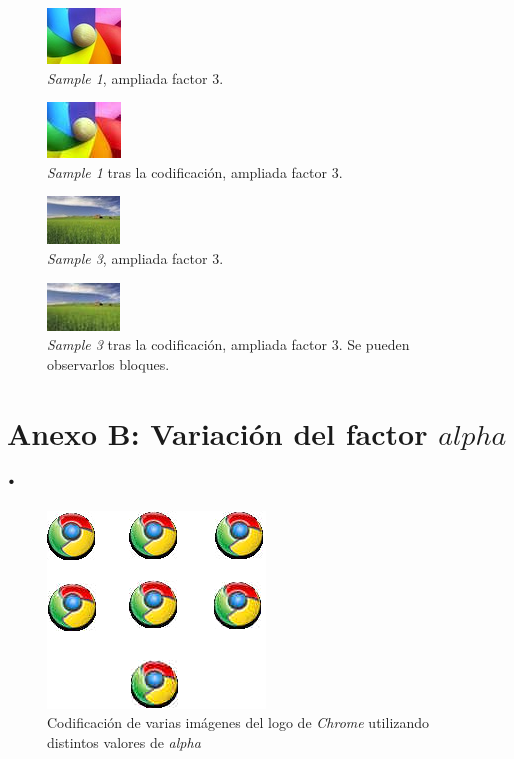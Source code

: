 \documentclass[%
	final,
	reprint,
	notitlepage,
	narroweqnarray,
	inline,
	twoside,
	invited
	]{ieee}
\begin{document}
\begin{thebibliography}{1}
\begin{figure}[H]
\centering
	\includegraphics[scale=3]{./img/sample_1_in.jpg}
	\caption{\textit{Sample 1}, ampliada factor 3.}
\end{figure}

\begin{figure}[H]
\centering
	\includegraphics[scale=3]{./img/sample_1_alpha_1_out.jpg}
	\caption{\textit{Sample 1} tras la codificación, ampliada factor 3.}
\end{figure}

\begin{figure}[H]
\centering
	\includegraphics[scale=3]{./img/sample_3_in.jpg}
	\caption{\textit{Sample 3}, ampliada factor 3.}
\end{figure}

\begin{figure}[H]
\centering
	\includegraphics[scale=3]{./img/sample_3_alpha_1_out.jpg}
	\caption{\textit{Sample 3} tras la codificación, ampliada factor 3. Se pueden observarlos bloques.}
\end{figure}

\section*{Anexo B: Variación del factor $alpha$.}

\begin{figure}[H]
\centering
	\includegraphics[scale=2.3]{./img/chromes.png}
	\caption{Codificación de varias imágenes del logo de \textit{Chrome} utilizando distintos valores de \textit{alpha}}
\end{figure}


\end{thebibliography}
\end{document}
